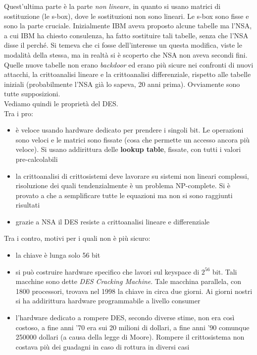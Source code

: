 \documentclass[a4paper,12pt, oneside]{book}
\begin{document}
Quest'ultima parte è la parte \textit{non lineare}, in quanto si usano matrici
di sostituzione (le s-box), dove le sostituzioni non sono lineari. Le s-box sono
fisse e sono la parte cruciale. Inizialmente IBM aveva proposto alcune tabelle
ma l'NSA, a cui IBM ha chiesto consulenza, ha fatto sostituire tali tabelle,
senza che l'NSA disse il perché. Si temeva che ci fosse dell'interesse un questa
modifica, viste le modalità della stessa, ma in realtà si è scoperto che NSA non
aveva secondi fini. Quelle nuove tabelle non erano \textit{backdoor} ed erano
più sicure nei confronti di nuovi attacchi, la crittoanalisi lineare e la
crittoanalisi differenziale, rispetto alle tabelle iniziali (probabilmente l'NSA
già lo sapeva, 20 anni prima). Ovviamente sono tutte supposizioni.\\
Vediamo quindi le proprietà del DES. \\
Tra i pro:
\begin{itemize}
  \item è veloce usando hardware dedicato per prendere i singoli bit. Le
  operazioni sono veloci e le matrici sono fissate (cosa che permette un accesso
  ancora più veloce). Si usano addirittura delle \textbf{lookup table}, fissate,
  con tutti i valori pre-calcolabili
  \item la crittoanalisi di crittosistemi deve lavorare su sistemi non lineari
  complessi, risoluzione dei quali tendenzialmente è un problema NP-complete. Si
  è provato a che a semplificare tutte le equazioni ma non si sono raggiunti
  risultati  
  \item grazie a NSA il DES resiste a crittoanalisi lineare e differenziale
\end{itemize}
Tra i contro, motivi per i quali non è più sicuro:
\begin{itemize}
  \item la chiave è lunga solo 56 bit
  \item si può costruire hardware specifico che lavori sul keyspace di $2^{56}$
  bit. Tali macchine sono dette \textit{DES Cracking Machine}. Tale
  macchina parallela, con 1800 processori, trovava nel 1998 la chiave in circa
  due giorni. Ai giorni nostri si ha addirittura hardware programmabile a
  livello consumer 
  \item l'hardware dedicato a rompere DES, secondo diverse stime, non era così
  costoso, a fine anni '70 
  era sui 20 milioni di dollari, a fine anni '90 comunque 250000
  dollari (a causa della legge di Moore). Rompere il crittosistema non costava
  più dei guadagni in caso di rottura in diversi casi  
\end{itemize}
\end{document}
